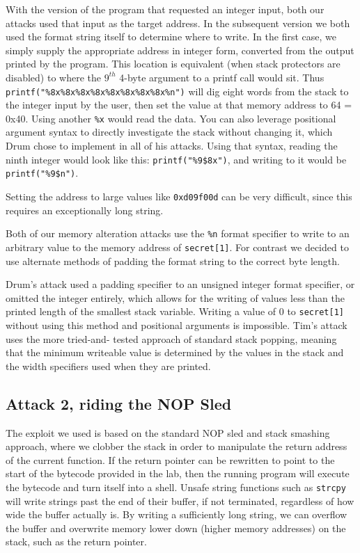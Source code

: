 With the version of the program that requested an integer input, both our attacks used that input as the target address.
In the subsequent version we both used the format string itself to determine where to write. In the first case, we
simply supply the appropriate address in integer form, converted from the output printed by the program. This location
is equivalent (when stack protectors are disabled) to where the $9^{th}$ 4-byte argument to a printf call would sit. Thus
{\tt printf("\%8x\%8x\%8x\%8x\%8x\%8x\%8x\%8x\%n")} will dig eight words from the stack to the integer input by the
user, then set the value at that memory address to 64 = 0x40. Using another {\tt\%x} would read the data. You can also
leverage positional argument syntax to directly investigate the stack without changing it, which Drum chose to implement
in all of his attacks. Using that syntax, reading the ninth integer would look like this: {\tt printf("\%9\$8x")}, and
writing to it would be {\tt printf("\%9\$n")}.

Setting the address to large values like {\tt 0xd09f00d} can be very difficult, since this requires an exceptionally
long string.

Both of our memory alteration attacks use the {\tt \%n} format specifier to write to an arbitrary value to the memory
address of {\tt secret[1]}. For contrast we decided to use alternate methods of padding the format string to the correct
byte length.

Drum's attack used a padding specifier to an unsigned integer format specifier, or omitted the integer entirely, which
allows for the writing of values less than the printed length of the smallest stack variable. Writing a value of 0 to
{\tt secret[1]} without using this method and positional arguments is impossible. Tim's attack uses the more tried-and-
tested approach of standard stack popping, meaning that the minimum writeable value is determined by the values in the
stack and the width specifiers used when they are printed.

\subsection{Attack 2, riding the NOP Sled}

The exploit we used is based on the standard NOP sled and stack smashing approach, where we clobber the stack in order
to manipulate the return address of the current function. If the return pointer can be rewritten to point to the start
of the bytecode provided in the lab, then the running program will execute the bytecode and turn itself into a shell.
Unsafe string functions such as {\tt strcpy} will write strings past the end of their buffer, if not terminated,
regardless of how wide the buffer actually is. By writing a sufficiently long string, we can overflow the buffer and
overwrite memory lower down (higher memory addresses) on the stack, such as the return pointer.

